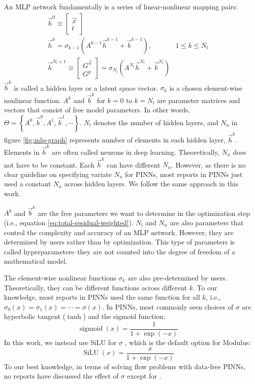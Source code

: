 An MLP network fundamentally is a series of linear-nonlinear mapping pairs:
\begin{equation}\label{eq:mlp-formula}
    \begin{array}{ll}
        \vec{h}^0 \equiv \begin{bmatrix} \vec{x} \\ t \end{bmatrix} & \\
        \vec{h}^k = \sigma_{k-1}\left(A^{k-1}\vec{h}^{k-1}+\vec{b}^{k-1}\right)\text{,} & 1 \le k \le N_l \\
        \vec{h}^{N_l+1}\equiv \begin{bmatrix} G^{\vec{u}} \\ G^p \end{bmatrix} = \sigma_{N_l}\left(A^{N_l}\vec{h}^{N_l}+\vec{b}^{N_l}\right) &
    \end{array}
\end{equation}
$\vec{h}^k$ is called a hidden layer or a latent space vector.
$\sigma_{k}$ is a chosen element-wise nonlinear function.
$A^{k}$ and $\vec{b}^k$ for $k=0$ to $k=N_l$ are parameter matrices and vectors that consist of free model parameters.
In other words, $\Theta=\left\{A^0, \vec{b}^0, A^1, \vec{b}^1, \cdots \right\}$.
$N_l$ denotes the number of hidden layers, and $N_n$ in figure \ref{fig:mlp-graph} represents number of elements in each hidden layer, $\vec{h}^k$.
Elements in $\vec{h}^k$ are often called neurons in deep learning.
Theoretically, $N_n$ does not have to be constant.
Each $\vec{h}^k$ can have different $N_n$.
However, as there is no clear guideline on specifying variate $N_n$ for PINNs, most reports in PINNs just used a constant $N_n$ across hidden layers.
We follow the same approach in this work.

$A^k$ and $\vec{b}^k$ are the free parameters we want to determine in the optimization step (i.e., equation \eqref{eq:total-residual-weighted}).
$N_l$ and $N_n$ are also parameters that control the complexity and accuracy of an MLP network.
However, they are determined by users rather than by optimization.
This type of parameters is called hyperparameters--they are not counted into the degree of freedom of a mathematical model.

The element-wise nonlinear functions $\sigma_{k}$ are also pre-determined by users.
Theoretically, they can be different functions across different $k$.
To our knowledge, most reports in PINNs used the same function for all $k$, i.e., $\sigma_0(x)=\sigma_1(x)=\cdots=\sigma(x)$.
In PINNs, most commonly seen choices of $\sigma$ are hyperbolic tangent ($\tanh$) and the sigmoid function:
\begin{equation}
    \operatorname{sigmoid}(x) = \frac{1}{1+\exp(-x)}
\end{equation}
In this work, we instead use SiLU for $\sigma$ \cite{hendrycks_gaussian_2020}, which is the default option for Modulus:
\begin{equation}\label{eq:silu}
    \operatorname{SiLU}(x) = \frac{x}{1+\exp(-x)}
\end{equation}
To our best knowledge, in terms of solving flow problems with data-free PINNs, no reports have discussed the effect of $\sigma$ except for \cite{li_integration_2010}.

